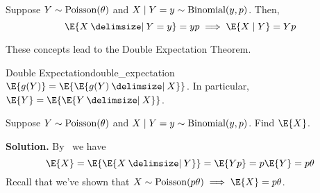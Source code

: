 \begin{Example}{}{}
    Suppose $ Y \sim \operatorname{Poisson}(\theta) $ and $ X\mid Y=y \sim \operatorname{Binomial}(y,p) $. Then,
    \[ \E{X\given Y=y}=yp\implies \E{X\mid Y}=Yp \]
\end{Example}
These concepts lead to the Double Expectation Theorem.
\begin{Theorem}{Double Expectation}{double_expectation}
    $ \E{g(Y)}=\E{\E{g(Y)\given X}} $.
    In particular, $ \E{Y}=\E{\E{Y\given X}} $.
\end{Theorem}
\begin{Example}{}{}
    Suppose $ Y \sim \operatorname{Poisson}(\theta) $ and $ X\mid Y=y \sim \operatorname{Binomial}(y,p) $. Find $ \E{X} $.

    \textbf{Solution.} By~ we have
    \[ \E{X}=\E{\E{X\given Y}}=\E{Yp}=p\E{Y}=p\theta \]
    Recall that we've shown that $ X \sim \poi(p\theta)\implies \E{X}=p\theta $.
\end{Example}
